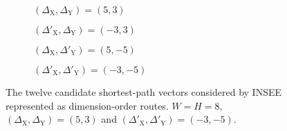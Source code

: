 				\begin{figure}
					\center
					\begin{subfigure}{0.45\linewidth}
						\center
						\caption{$(\Delta_\textrm{X}, \Delta_\textrm{Y}) = (5,3)$}
						\label{fig:insee-vector-candidates-no-wrap}
					\end{subfigure}
					\begin{subfigure}{0.45\linewidth}
						\center
						\caption{$(\Delta'_\textrm{X}, \Delta_\textrm{Y}) = (-3,3)$}
						\label{fig:insee-vector-candidates-wrap-x}
					\end{subfigure}
					
					\vspace{1em}
					
					\begin{subfigure}{0.45\linewidth}
						\center
						\caption{$(\Delta_\textrm{X}, \Delta'_\textrm{Y}) = (5,-5)$}
						\label{fig:insee-vector-candidates-wrap-y}
					\end{subfigure}
					\begin{subfigure}{0.45\linewidth}
						\center
						\caption{$(\Delta'_\textrm{X}, \Delta'_\textrm{Y}) = (-3,-5)$}
						\label{fig:insee-vector-candidates-wrap}
					\end{subfigure}
					
					\vspace{1em}
					
					
					\caption{The twelve candidate shortest-path vectors considered by INSEE
					represented as dimension-order routes. $W=H=8$,
					$(\Delta_\textrm{X},\Delta_\textrm{Y}) = (5, 3)$ and
					$(\Delta'_\textrm{X},\Delta'_\textrm{Y}) = (-3, -5)$.}
					\label{fig:insee-vector-candidates}
				\end{figure}
				
